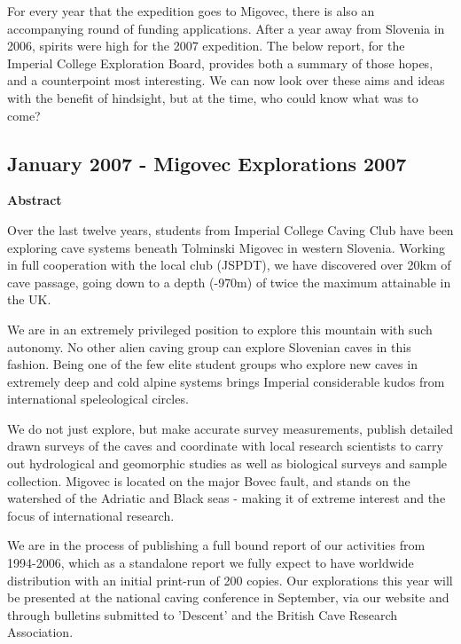 


For every year that the expedition goes to Migovec, there is also an accompanying round of funding applications. After a year away from Slovenia in 2006, spirits were high for the 2007 expedition. The below report, for the Imperial College Exploration Board, provides both a summary of those hopes, and a counterpoint most interesting. We can now look over these aims and ideas with the benefit of hindsight, but at the time, who could know what was to come?



\subsection{January 2007 - Migovec Explorations 2007}

\textbf{Abstract}

Over the last twelve years, students from Imperial College Caving Club have been exploring cave systems beneath Tolminski Migovec in western Slovenia. Working in full cooperation with the local club (JSPDT), we have discovered over 20km of cave passage, going down to a depth (-970m) of twice the maximum attainable in the UK.

We are in an extremely privileged position to explore this mountain with such autonomy. No other alien caving group can explore Slovenian caves in this fashion. Being one of the few elite student groups who explore new caves in extremely deep and cold alpine systems brings Imperial considerable kudos from international speleological circles.

We do not just explore, but make accurate survey measurements, publish detailed drawn surveys of the caves and coordinate with local research scientists to carry out hydrological and geomorphic studies as well as biological surveys and sample collection. Migovec is located on the major Bovec fault, and stands on the watershed of the Adriatic and Black seas - making it of extreme interest and the focus of international research.

We are in the process of publishing a full bound report of our activities from 1994-2006, which as a standalone report we fully expect to have worldwide distribution with an initial print-run of 200 copies. Our explorations this year will be presented at the national caving conference in September, via our website and through bulletins submitted to 'Descent' and the British Cave Research Association.

